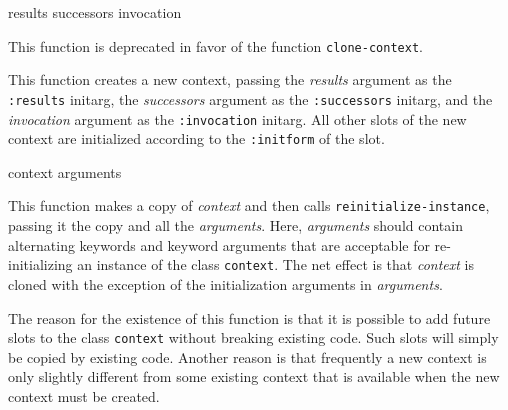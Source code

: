  {results successors invocation}

This function is deprecated in favor of the function
\texttt{clone-context}.

This function creates a new context, passing the \textit{results}
argument as the \texttt{:results} initarg, the \textit{successors}
argument as the \texttt{:successors} initarg, and the
\textit{invocation} argument as the \texttt{:invocation} initarg.
All other slots of the new context are initialized according to the
\texttt{:initform} of the slot.

 {context \rest arguments}

This function makes a copy of \textit{context} and then calls
\texttt{reinitialize-instance}, passing it the copy and all the
\textit{arguments}.  Here, \textit{arguments} should contain
alternating keywords and keyword arguments that are acceptable for
re-initializing an instance of the class \texttt{context}.  The net
effect is that \textit{context} is cloned with the exception of the
initialization arguments in \textit{arguments}.

The reason for the existence of this function is that it is possible
to add future slots to the class \texttt{context} without breaking
existing code.  Such slots will simply be copied by existing code.
Another reason is that frequently a new context is only slightly
different from some existing context that is available when the new
context must be created.
